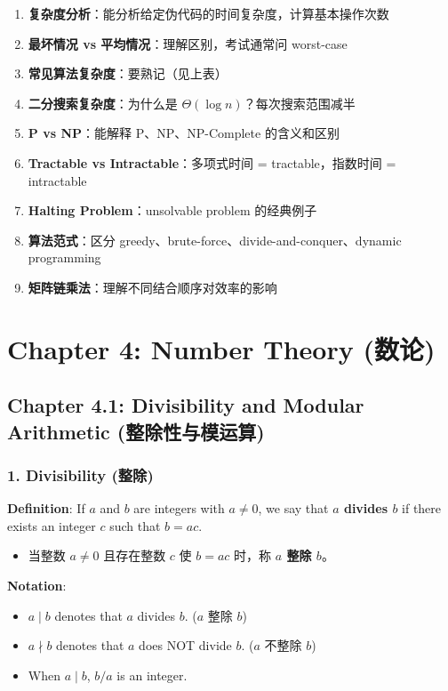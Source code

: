 \documentclass[10pt,a4paper,openany]{ctexbook}
\theoremstyle{definition}
\theoremstyle{remark}
\begin{document}
\begin{enumerate}
\item \textbf{复杂度分析}：能分析给定伪代码的时间复杂度，计算基本操作次数
\item \textbf{最坏情况 vs 平均情况}：理解区别，考试通常问 worst-case
\item \textbf{常见算法复杂度}：要熟记（见上表）
\item \textbf{二分搜索复杂度}：为什么是 $\Theta(\log n)$？每次搜索范围减半
\item \textbf{P vs NP}：能解释 P、NP、NP-Complete 的含义和区别
\item \textbf{Tractable vs Intractable}：多项式时间 = tractable，指数时间 = intractable
\item \textbf{Halting Problem}：unsolvable problem 的经典例子
\item \textbf{算法范式}：区分 greedy、brute-force、divide-and-conquer、dynamic programming
\item \textbf{矩阵链乘法}：理解不同结合顺序对效率的影响

\end{enumerate}

\chapter{Chapter 4: Number Theory (数论)}

\section{Chapter 4.1: Divisibility and Modular Arithmetic (整除性与模运算)}

\vspace{-2pt}

\subsection{1. Divisibility (整除)}

\textbf{Definition}: If $a$ and $b$ are integers with $a \neq 0$, we say that \textbf{$a$ divides $b$} if there exists an integer $c$ such that $b = ac$.
\begin{itemize}
\item 当整数 $a \neq 0$ 且存在整数 $c$ 使 $b = ac$ 时，称 \textbf{$a$ 整除 $b$}。

\end{itemize}

\textbf{Notation}:
\begin{itemize}
\item $a \mid b$ denotes that $a$ divides $b$. ($a$ 整除 $b$)
\item $a \nmid b$ denotes that $a$ does NOT divide $b$. ($a$ 不整除 $b$)
\item When $a \mid b$, $b/a$ is an integer.

\end{itemize}
\end{document}
